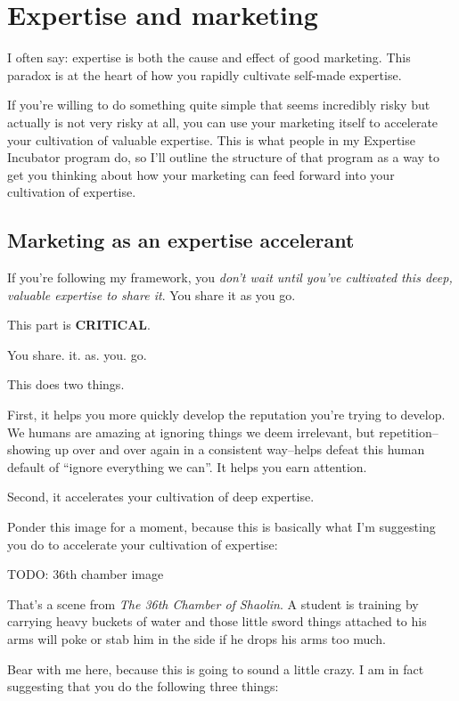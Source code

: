 \section{Expertise and marketing}

I often say: expertise is both the cause and effect of good marketing. This paradox is at the heart of how you rapidly cultivate self-made expertise.

If you're willing to do something quite simple that seems incredibly risky but actually is not very risky at all, you can use your marketing itself to accelerate your cultivation of valuable expertise. This is what people in my Expertise Incubator program do, so I'll outline the structure of that program as a way to get you thinking about how your marketing can feed forward into your cultivation of expertise.

\subsection{Marketing as an expertise accelerant}

If you're following my framework, you \emph{don't wait until you've cultivated this deep, valuable expertise to share it}. You share it as you go.

This part is \textbf{CRITICAL}.

You share. it. as. you. go.

This does two things.

First, it helps you more quickly develop the reputation you're trying to develop. We humans are amazing at ignoring things we deem irrelevant, but repetition--showing up over and over again in a consistent way--helps defeat this human default of ``ignore everything we can''. It helps you earn attention.

Second, it accelerates your cultivation of deep expertise.

Ponder this image for a moment, because this is basically what I'm suggesting you do to accelerate your cultivation of expertise:

TODO: 36th chamber image

That's a scene from \emph{The 36th Chamber of Shaolin}. A student is training by carrying heavy buckets of water and those little sword things attached to his arms will poke or stab him in the side if he drops his arms too much.

Bear with me here, because this is going to sound a little crazy. I am in fact suggesting that you do the following three things:

